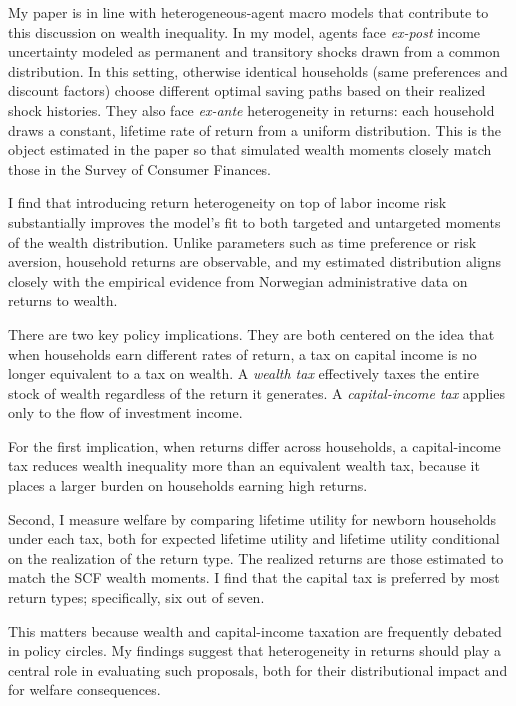 \documentclass[11pt]{article}
\begin{document}
\vspace{0.5em}
\noindent
My paper is in line with heterogeneous-agent macro models that contribute to this discussion on wealth inequality. In my model, agents face \emph{ex-post} income uncertainty modeled as permanent and transitory shocks drawn from a common distribution. In this setting, otherwise identical households (same preferences and discount factors) choose different optimal saving paths based on their realized shock histories. They also face \emph{ex-ante} heterogeneity in returns: each household draws a constant, lifetime rate of return from a uniform distribution. This is the object estimated in the paper so that simulated wealth moments closely match those in the Survey of Consumer Finances.

\vspace{0.5em}
\noindent
I find that introducing return heterogeneity on top of labor income risk substantially improves the model’s fit to both targeted and untargeted moments of the wealth distribution. Unlike parameters such as time preference or risk aversion, household returns are observable, and my estimated distribution aligns closely with the empirical evidence from Norwegian administrative data on returns to wealth.


\vspace{0.5em}
\noindent

There are two key policy implications. They are both centered on the idea that when households earn different rates of return, a tax on capital income is no longer equivalent to a tax on wealth. A \textit{wealth tax} effectively taxes the entire stock of wealth regardless of the return it generates. A \textit{capital-income tax} applies only to the flow of investment income.

For the first implication, when returns differ across households, a capital-income tax reduces wealth inequality more than an equivalent wealth tax, because it places a larger burden on households earning high returns.

\par Second, I measure welfare by comparing lifetime utility for newborn households under each tax, both for expected lifetime utility and lifetime utility conditional on the realization of the return type. The realized returns are those estimated to match the SCF wealth moments. I find that the capital tax is preferred by most return types; specifically, six out of seven.

This matters because wealth and capital-income taxation are frequently debated in policy circles. My findings suggest that heterogeneity in returns should play a central role in evaluating such proposals, both for their distributional impact and for welfare consequences.
\end{document}
